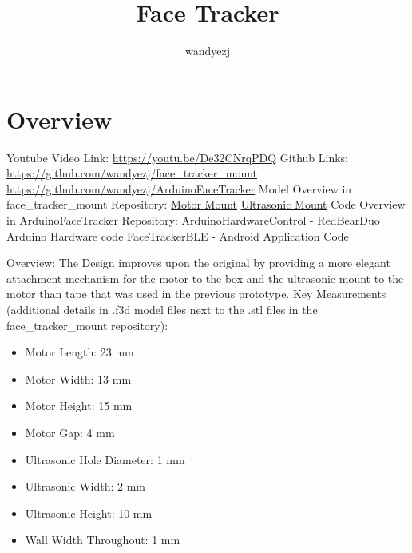 \documentclass{article}
\title{Face Tracker}
\author{wandyezj}
\begin{document}
	\maketitle
	\tableofcontents
	
	
	
	\clearpage
	
	\section{Overview}
	
	Youtube Video Link: \href{https://youtu.be/De32CNrqPDQ}{https://youtu.be/De32CNrqPDQ}\newline
	Github Links: \newline
	\href{https://github.com/wandyezj/face_tracker_mount}{https://github.com/wandyezj/face\_tracker\_mount}\newline
	\href{https://github.com/wandyezj/ArduinoFaceTracker}{https://github.com/wandyezj/ArduinoFaceTracker}\newline
	\newline
	Model Overview in face\_tracker\_mount Repository:
	\newline
	\href{https://github.com/wandyezj/face\_tracker\_mount/blob/master/cad/motor\_mount.stl}{Motor Mount}\newline
	\href{https://github.com/wandyezj/face\_tracker\_mount/blob/master/cad/ultrasonic\_mount.stl}{Ultrasonic Mount}\newline
	\newline	
	Code Overview in ArduinoFaceTracker Repository:
	\newline
	ArduinoHardwareControl - RedBearDuo Arduino Hardware code
	\newline
	FaceTrackerBLE - Android Application Code
	\newline
	\newline
	
	

	Overview:
	\newline
	The Design improves upon the original by providing a more elegant attachment mechanism for the motor to the box and the ultrasonic mount to the motor than tape that was used in the previous prototype.
	\newline
	\newline
	Key Measurements (additional details in .f3d model files next to the .stl files in the face\_tracker\_mount repository):
	\begin{itemize}
		\item Motor Length: 23 mm
		\item Motor Width: 13 mm
		\item Motor Height: 15 mm
		\item Motor Gap: 4 mm
		\item Ultrasonic Hole Diameter: 1 mm
		\item Ultrasonic Width: 2 mm
		\item Ultrasonic Height: 10 mm
		\item Wall Width Throughout: 1 mm
	\end{itemize}
\end{document}
